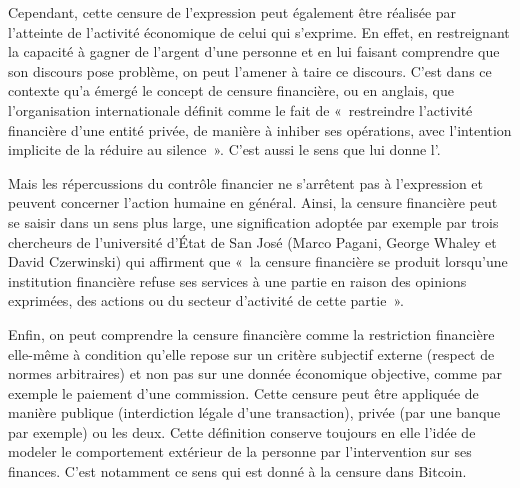 Cependant, cette censure de l'expression peut également être réalisée par l'atteinte de l'activité économique de celui qui s'exprime. En effet, en restreignant la capacité à gagner de l'argent d'une personne et en lui faisant comprendre que son discours pose problème, on peut l'amener à taire ce discours. C'est dans ce contexte qu'a émergé le concept de censure financière, ou  en anglais, que l'organisation internationale  définit comme le fait de «~restreindre l'activité financière d'une entité privée, de manière à inhiber ses opérations, avec l'intention implicite de la réduire au silence~». C'est aussi le sens que lui donne l'. %

Mais les répercussions du contrôle financier ne s'arrêtent pas à l'expression et peuvent concerner l'action humaine en général. Ainsi, la censure financière peut se saisir dans un sens plus large, une signification adoptée par exemple par trois chercheurs de l'université d'État de San José (Marco Pagani, George Whaley et David Czerwinski) qui affirment que «~la censure financière se produit lorsqu'une institution financière refuse ses services à une partie en raison des opinions exprimées, des actions ou du secteur d'activité de cette partie~». %

Enfin, on peut comprendre la censure financière comme la restriction financière elle-même à condition qu'elle repose sur un critère subjectif externe (respect de normes arbitraires) et non pas sur une donnée économique objective, comme par exemple le paiement d'une commission. Cette censure peut être appliquée de manière publique (interdiction légale d'une transaction), privée (par une banque par exemple) ou les deux. Cette définition conserve toujours en elle l'idée de modeler le comportement extérieur de la personne par l'intervention sur ses finances. C'est notamment ce sens qui est donné à la censure dans Bitcoin.

